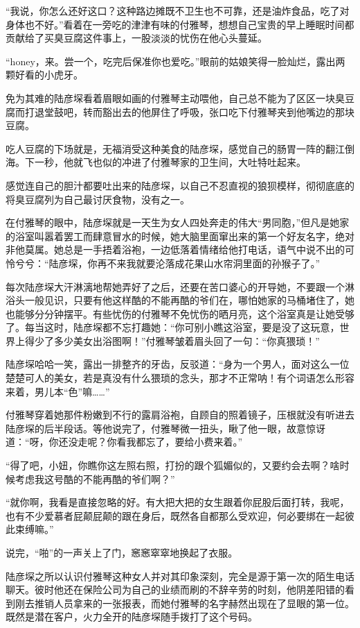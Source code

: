 \documentclass[11pt,a4paper]{article}
\begin{document}
“我说，你怎么还好这口？这种路边摊既不卫生也不可靠，还是油炸食品，吃了对身体也不好。”看着在一旁吃的津津有味的付雅琴，想想自己宝贵的早上睡眠时间都贡献给了买臭豆腐这件事上，一股淡淡的忧伤在他心头蔓延。﻿﻿

“honey，来。尝一个，吃完后保准你也爱吃。”眼前的姑娘笑得一脸灿烂，露出两颗好看的小虎牙。﻿﻿

免为其难的陆彦堔看着眉眼如画的付雅琴主动喂他，自己总不能为了区区一块臭豆腐而打退堂鼓吧，转而豁出去的他屏住了呼吸，张口吃下付雅琴夹到他嘴边的那块豆腐。﻿﻿

吃人豆腐的下场就是，无福消受这种美食的陆彦堔，感觉自己的肠胃一阵的翻江倒海。下一秒，他就飞也似的冲进了付雅琴家的卫生间，大吐特吐起来。﻿﻿

感觉连自己的胆汁都要吐出来的陆彦堔，以自己不忍直视的狼狈模样，彻彻底底的将臭豆腐列为自己最讨厌食物，没有之一。﻿﻿

在付雅琴的眼中，陆彦堔就是一天生为女人四处奔走的伟大“男同胞，”但凡是她家的浴室叫嚣着罢工而肆意冒水的时候，她大脑里面窜出来的第一个好友名字，绝对非他莫属。她总是一手捂着浴袍，一边低落着情绪给他打电话，语气中说不出的可怜兮兮：“陆彦堔，你再不来我就要沦落成花果山水帘洞里面的孙猴子了。”﻿﻿

每次陆彦堔大汗淋漓地帮她弄好了之后，还要在苦口婆心的开导她，不要跟一个淋浴头一般见识，只要有他这样酷的不能再酷的爷们在，哪怕她家的马桶堵住了，她也能够分分钟摆平。有些忧伤的付雅琴不免忧伤的晒月亮，这个浴室真是让她受够了。每当这时，陆彦堔都不忘打趣她：“你可别小瞧这浴室，要是没了这玩意，世界上得少了多少美女出浴图啊！”付雅琴皱着眉头回了一句：“你真猥琐！”﻿﻿

陆彦堔哈哈一笑，露出一排整齐的牙齿，反驳道：“身为一个男人，面对这么一位楚楚可人的美女，若是真没有什么猥琐的念头，那才不正常呐！有个词语怎么形容来着，男儿本“色”嘛……”﻿﻿

付雅琴穿着她那件粉嫩到不行的露肩浴袍，自顾自的照着镜子，压根就没有听进去陆彦堔的后半段话。等他说完了，付雅琴微一扭头，瞅了他一眼，故意惊讶道：“呀，你还没走呢？你看我都忘了，要给小费来着。”﻿﻿

“得了吧，小妞，你瞧你这左照右照，打扮的跟个狐媚似的，又要约会去啊？啥时候考虑我这号酷的不能再酷的爷们啊？”﻿﻿

“就你啊，我看是直接忽略的好。有大把大把的女生跟着你屁股后面打转，我呢，也有不少爱慕者屁颠屁颠的跟在身后，既然各自都那么受欢迎，何必要绑在一起彼此束缚嘛。”﻿﻿

说完，“啪”的一声关上了门，窸窸窣窣地换起了衣服。﻿﻿

陆彦堔之所以认识付雅琴这种女人并对其印象深刻，完全是源于第一次的陌生电话聊天。彼时他还在保险公司为自己的业绩而刷的不辞辛劳的时刻，他阴差阳错的看到刚去推销人员拿来的一张报表，而她付雅琴的名字赫然出现在了显眼的第一位。既然是潜在客户，火力全开的陆彦堔随手拨打了这个号码。﻿﻿
\end{document}

